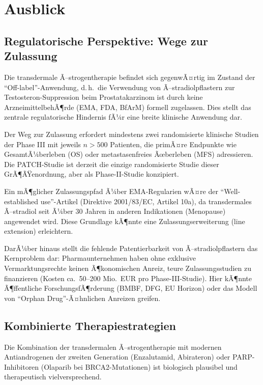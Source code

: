 ﻿\documentclass[a4paper,12pt]{article}
\theoremstyle{definition}
\begin{document}
\section{Ausblick}

\subsection{Regulatorische Perspektive: Wege zur Zulassung}

Die transdermale Ã–strogentherapie befindet sich gegenwÃ¤rtig im Zustand der ``Off-label''-Anwendung, d.\,h.\ die Verwendung von Ã–stradiolpflastern zur Testosteron-Suppression beim Prostatakarzinom ist durch keine ArzneimittelbehÃ¶rde (EMA, FDA, BfArM) formell zugelassen.
Dies stellt das zentrale regulatorische Hindernis fÃ¼r eine breite klinische Anwendung dar.

Der Weg zur Zulassung erfordert mindestens zwei randomisierte klinische Studien der Phase III mit jeweils $n > 500$ Patienten, die primÃ¤re Endpunkte wie GesamtÃ¼berleben (OS) oder metastasenfreies Ãœberleben (MFS) adressieren.
Die PATCH-Studie ist derzeit die einzige randomisierte Studie dieser GrÃ¶ÃŸenordnung, aber als Phase-II-Studie konzipiert.

Ein mÃ¶glicher Zulassungspfad Ã¼ber EMA-Regularien wÃ¤re der ``Well-established use''-Artikel (Direktive 2001/83/EC, Artikel 10a), da transdermales Ã–stradiol seit Ã¼ber 30 Jahren in anderen Indikationen (Menopause) angewendet wird.
Diese Grundlage kÃ¶nnte eine Zulassungserweiterung (line extension) erleichtern.

DarÃ¼ber hinaus stellt die fehlende Patentierbarkeit von Ã–stradiolpflastern das Kernproblem dar: Pharmaunternehmen haben ohne exklusive Vermarktungsrechte keinen Ã¶konomischen Anreiz, teure Zulassungsstudien zu finanzieren (Kosten ca.\ 50--200 Mio.\ EUR pro Phase-III-Studie).
Hier kÃ¶nnte Ã¶ffentliche ForschungsfÃ¶rderung (BMBF, DFG, EU Horizon) oder das Modell von ``Orphan Drug''-Ã¤hnlichen Anreizen greifen.

\subsection{Kombinierte Therapiestrategien}

Die Kombination der transdermalen Ã–strogentherapie mit modernen Antiandrogenen der zweiten Generation (Enzalutamid, Abirateron) oder PARP-Inhibitoren (Olaparib bei BRCA2-Mutationen) ist biologisch plausibel und therapeutisch vielversprechend.
\end{document}
